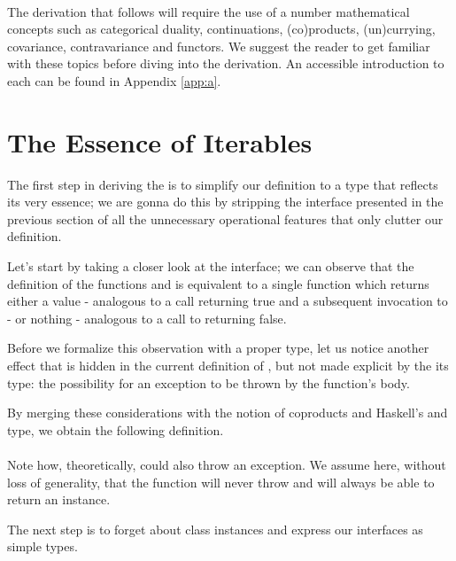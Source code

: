 \\

The derivation that follows will require the use of a number mathematical concepts such as categorical duality, continuations, (co)products, (un)currying, covariance, contravariance and functors. We suggest the reader to get familiar with these topics before diving into the derivation. An accessible introduction to each can be found in Appendix \ref{app:a}.

\section{The Essence of Iterables}

The first step in deriving the  is to simplify our  definition to a type that reflects its very essence; we are gonna do this by stripping the interface presented in the previous section of all the unnecessary operational features that only clutter our definition.

Let's start by taking a closer look at the  interface; we can observe that the definition of the functions  and  is equivalent to a single function which returns either a value - analogous to a  call returning true and a subsequent invocation to  - or nothing - analogous to a call to  returning false. 

Before we formalize this observation with a proper type, let us notice another effect that is hidden in the current definition of , but not made explicit by the its type: the possibility for an exception to be thrown by the function's body. 

By merging these considerations with the notion of coproducts and Haskell's  and  type, we obtain the following definition.\\

\\

Note how, theoretically,  could also throw an exception. We assume here, without loss of generality, that the function will never throw and will always be able to return an  instance.

The next step is to forget about class instances and express our interfaces as simple types.\\

